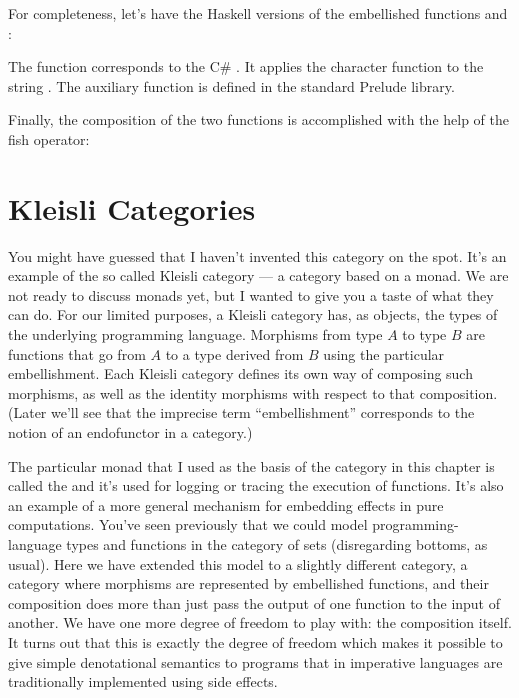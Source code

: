 For completeness, let's have the Haskell versions of the embellished
functions  and :

The function  corresponds to the C\# . It
applies the character function  to the string
. The auxiliary function  is defined in the
standard Prelude library.

Finally, the composition of the two functions is accomplished with the
help of the fish operator:


\section{Kleisli Categories}

You might have guessed that I haven't invented this category on the
spot. It's an example of the so called Kleisli category --- a category
based on a monad. We are not ready to discuss monads yet, but I wanted
to give you a taste of what they can do. For our limited purposes, a
Kleisli category has, as objects, the types of the underlying
programming language. Morphisms from type $A$ to type $B$ are functions that
go from $A$ to a type derived from $B$ using the particular embellishment.
Each Kleisli category defines its own way of composing such morphisms,
as well as the identity morphisms with respect to that composition.
(Later we'll see that the imprecise term ``embellishment'' corresponds
to the notion of an endofunctor in a category.)

The particular monad that I used as the basis of the category in this
chapter is called the  and it's used for logging or
tracing the execution of functions. It's also an example of a more
general mechanism for embedding effects in pure computations. You've
seen previously that we could model programming-language types and
functions in the category of sets (disregarding bottoms, as usual). Here
we have extended this model to a slightly different category, a category
where morphisms are represented by embellished functions, and their
composition does more than just pass the output of one function to the
input of another. We have one more degree of freedom to play with: the
composition itself. It turns out that this is exactly the degree of
freedom which makes it possible to give simple denotational semantics to
programs that in imperative languages are traditionally implemented
using side effects.


